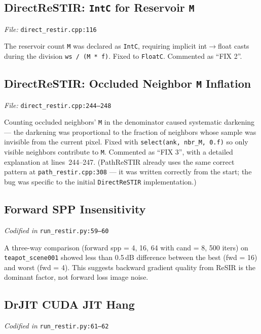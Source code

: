 \subsection{DirectReSTIR: \texttt{IntC} for Reservoir \texttt{M}}
\label{sec:intcbug}

\emph{File:} \texttt{direct\_restir.cpp:116}

The reservoir count \texttt{M} was declared as \texttt{IntC}, requiring
implicit int$\rightarrow$float casts during the division
\texttt{ws / (M * f)}. Fixed to \texttt{FloatC}. Commented as ``FIX 2''.

\subsection{DirectReSTIR: Occluded Neighbor \texttt{M} Inflation}
\label{sec:occludedbug}

\emph{File:} \texttt{direct\_restir.cpp:244--248}

Counting occluded neighbors' \texttt{M} in the denominator caused systematic
darkening --- the darkening was proportional to the fraction of neighbors
whose sample was invisible from the current pixel. Fixed with
\texttt{select(ank, nbr\_M, 0.f)} so only visible neighbors contribute to
\texttt{M}. Commented as ``FIX 3'', with a detailed explanation at
lines~244--247.
(PathReSTIR already uses the same correct pattern at
\texttt{path\_restir.cpp:308} --- it was written correctly from the start;
the bug was specific to the initial \texttt{DirectReSTIR} implementation.)

\subsection{Forward SPP Insensitivity}

\emph{Codified in} \texttt{run\_restir.py:59--60}

A three-way comparison (forward spp = 4, 16, 64 with cand = 8, 500 iters)
on \texttt{teapot\_scene001} showed less than 0.5\,dB difference between
the best (fwd = 16) and worst (fwd = 4). This suggests backward gradient
quality from ReSIR is the dominant factor, not forward loss image noise.

\subsection{DrJIT CUDA JIT Hang}

\emph{Codified in} \texttt{run\_restir.py:61--62}

